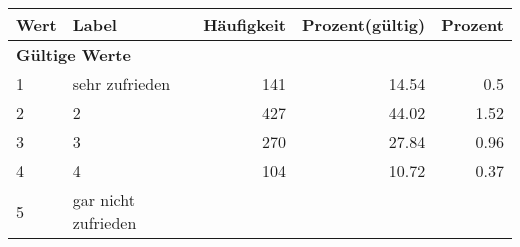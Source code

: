      \begin{longtable}{lXrrr}
     \toprule
     \textbf{Wert} & \textbf{Label} & \textbf{Häufigkeit} & \textbf{Prozent(gültig)} & \textbf{Prozent} \\
     \endhead
     \midrule
     \multicolumn{5}{l}{\textbf{Gültige Werte}}\\

     1 &
     \multicolumn{1}{X}{ sehr zufrieden   } &


       \num{141} &
       \num[round-mode=places,round-precision=2]{14,54} &
         \num[round-mode=places,round-precision=2]{0,5} \\

     2 &
     \multicolumn{1}{X}{ 2   } &


       \num{427} &
       \num[round-mode=places,round-precision=2]{44,02} &
         \num[round-mode=places,round-precision=2]{1,52} \\

     3 &
     \multicolumn{1}{X}{ 3   } &


       \num{270} &
       \num[round-mode=places,round-precision=2]{27,84} &
         \num[round-mode=places,round-precision=2]{0,96} \\

     4 &
     \multicolumn{1}{X}{ 4   } &


       \num{104} &
       \num[round-mode=places,round-precision=2]{10,72} &
         \num[round-mode=places,round-precision=2]{0,37} \\

     5 &
     \multicolumn{1}{X}{ gar nicht zufrieden   } &



\end{longtable}
